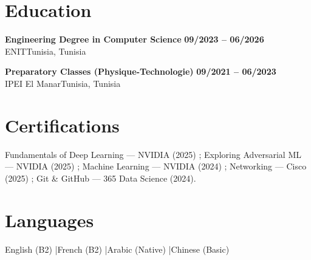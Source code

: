 \documentclass[a4paper,9pt]{article}
\newcommand{\cventry}[4]{\textbf{#1} \hfill \textbf{#4}\\[1pt]#2{\ifx\relax#3\relax\else, #3\fi}\par\vspace{1pt}}
\begin{document}
\section{Education}
\cventry{Engineering Degree in Computer Science}{ENIT}{Tunisia}{09/2023 -- 06/2026}
\cventry{Preparatory Classes (Physique-Technologie)}{IPEI El Manar}{Tunisia}{09/2021 -- 06/2023}
\section{Certifications}
Fundamentals of Deep Learning --- NVIDIA (2025) ; Exploring Adversarial ML --- NVIDIA (2025) ; Machine Learning --- NVIDIA (2024) ; Networking --- Cisco (2025) ; Git \& GitHub --- 365 Data Science (2024).
\section{Languages}
English (B2) \quad|\quad French (B2) \quad|\quad Arabic (Native) \quad|\quad Chinese (Basic)
\end{document}

